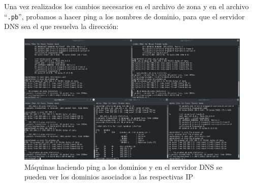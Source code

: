 \documentclass[12pt,letterpaper]{article}
\begin{document}
Una vez realizados los cambios necesarios en el archivo de zona y en el archivo ``\texttt{.pb}'', probamos a hacer ping a los nombres de dominio, para que el servidor DNS sea el que resuelva la dirección:
\begin{figure}[h]
	\centering
	\includegraphics[scale=0.25]{DNS.png}
	\caption{Máquinas haciendo ping a los dominios y en el servidor DNS se pueden ver los dominios asociados a las respectivas IP}
\end{figure}
\end{document}
